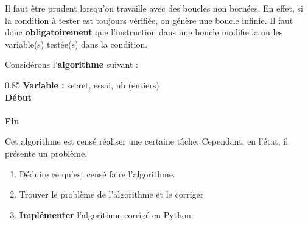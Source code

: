 \medskip
\begin{remarque}
Il faut être prudent lorsqu'on travaille avec des boucles non bornées. En effet, si la condition à tester est toujours vérifiée, on génère une boucle infinie. Il faut donc \textbf{obligatoirement} que l'instruction dans une boucle  modifie la ou les variable(s) testée(s) dans la condition.
\end{remarque}

\vspace{2mm}
\begin{boxexstheorieligne}
\exo
Considérons l'{\bf algorithme} suivant :

\medskip
\begin{center}
\begin{affichagealgorithme}{0.85}\small
\textbf{Variable :} secret, essai, nb (entiers)\\
\textbf{Début}\\
\\
\textbf{Fin}
\end{affichagealgorithme}
\end{center}

\vspace{-1mm}
Cet algorithme est censé réaliser une certaine tâche. Cependant, en l'état, il présente un problème.
\begin{enumerate}[label=\alph*),itemsep=0mm,left=0mm]
\item Déduire ce qu'est censé faire l'algorithme.
\item Trouver le problème de l'algorithme et le corriger
\item \textbf{Implémenter} l'algorithme corrigé en Python.
\end{enumerate} 





\end{boxexstheorieligne}
